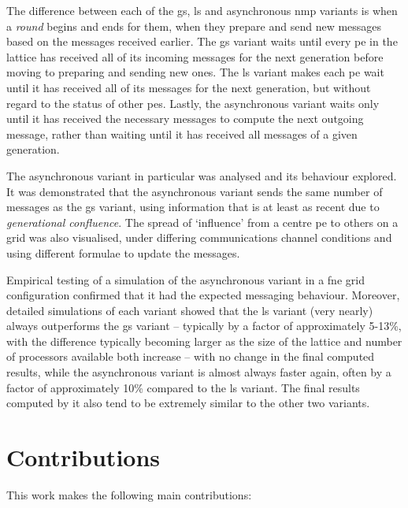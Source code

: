 The difference between each of the \gls{gs}, \gls{ls} and asynchronous \gls{nmp} variants is when a \emph{round} begins and ends for them, \ie{} when they prepare and send new messages based on the messages received earlier.  The \gls{gs} variant waits until every \gls{pe} in the lattice has received all of its incoming messages for the next generation before moving to preparing and sending new ones.  The \gls{ls} variant makes each \gls{pe} wait until it has received all of its messages for the next generation, but without regard to the status of other \glspl{pe}.  Lastly, the asynchronous variant waits only until it has received the necessary messages to compute the next outgoing message, rather than waiting until it has received all messages of a given generation.

The asynchronous variant in particular was analysed and its behaviour explored.  It was demonstrated that the asynchronous variant sends the same number of messages as the \gls{gs} variant, using information that is at least as recent due to \emph{generational confluence}.  The spread of `influence' from a centre \gls{pe} to others on a grid was also visualised, under differing communications channel conditions and using different formulae to update the messages.

Empirical testing of a simulation of the asynchronous variant in a \gls{fne} grid configuration confirmed that it had the expected messaging behaviour.  Moreover, detailed simulations of each variant showed that the \gls{ls} variant (very nearly) always outperforms the \gls{gs} variant -- typically by a factor of approximately 5-13\%, with the difference typically becoming larger as the size of the lattice and number of processors available both increase -- with no change in the final computed results, while the asynchronous variant is almost always faster again, often by a factor of approximately 10\% compared to the \gls{ls} variant.  The final results computed by it also tend to be extremely similar to the other two variants.


\section{Contributions}
This work makes the following main contributions:

